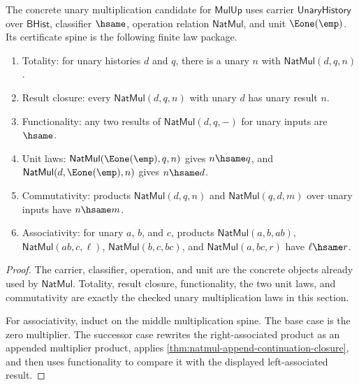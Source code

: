 \begin{theorem}
\label{thm:unary-multiplication-mulup-certificate}
The concrete unary multiplication candidate for $\mathsf{MulUp}$ uses carrier
$\mathsf{UnaryHistory}$ over $\mathsf{BHist}$, classifier $\hsame$, operation
relation $\mathsf{NatMul}$, and unit $\Eone(\emp)$. Its certificate spine is the
following finite law package.
\begin{enumerate}
\item Totality: for unary histories $d$ and $q$, there is a unary $n$ with
$\mathsf{NatMul}(d,q,n)$.
\item Result closure: every $\mathsf{NatMul}(d,q,n)$ with unary $d$ has unary
result $n$.
\item Functionality: any two results of $\mathsf{NatMul}(d,q,-)$ for unary
inputs are $\hsame$.
\item Unit laws: $\mathsf{NatMul}(\Eone(\emp),q,n)$ gives $n\hsame q$, and
$\mathsf{NatMul}(d,\Eone(\emp),n)$ gives $n\hsame d$.
\item Commutativity: products $\mathsf{NatMul}(d,q,n)$ and
$\mathsf{NatMul}(q,d,m)$ over unary inputs have $n\hsame m$.
\item Associativity: for unary $a$, $b$, and $c$, products
$\mathsf{NatMul}(a,b,ab)$, $\mathsf{NatMul}(ab,c,\ell)$,
$\mathsf{NatMul}(b,c,bc)$, and $\mathsf{NatMul}(a,bc,r)$ have
$\ell\hsame r$.
\end{enumerate}
\end{theorem}
\begin{proof}
The carrier, classifier, operation, and unit are the concrete objects already
used by $\mathsf{NatMul}$. Totality, result closure, functionality, the two unit
laws, and commutativity are exactly the checked unary multiplication laws in
this section.

For associativity, induct on the middle multiplication spine. The base case is
the zero multiplier. The successor case rewrites the right-associated product
as an appended multiplier product, applies
\autoref{thm:natmul-append-continuation-closure}, and then uses functionality
to compare it with the displayed left-associated result.
\end{proof}

